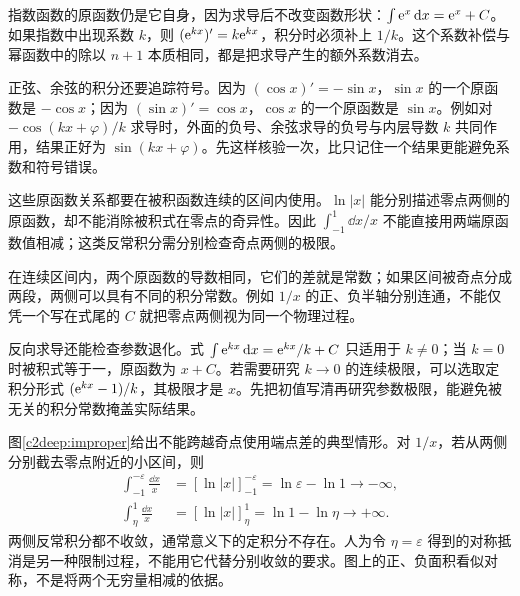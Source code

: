 指数函数的原函数仍是它自身，因为求导后不改变函数形状：$\int\mathrm e^x\mathop{}\!\mathrm d x=\mathrm e^x+C$。如果指数中出现系数 $k$，则 $(\mathrm e^{kx})'=k\mathrm e^{kx}$，积分时必须补上 $1/k$。这个系数补偿与幂函数中的除以 $n+1$ 本质相同，都是把求导产生的额外系数消去。

正弦、余弦的积分还要追踪符号。因为 $(\cos x)'=-\sin x$，$\sin x$ 的一个原函数是 $-\cos x$；因为 $(\sin x)'=\cos x$，$\cos x$ 的一个原函数是 $\sin x$。例如对 $-\cos(kx+\varphi)/k$ 求导时，外面的负号、余弦求导的负号与内层导数 $k$ 共同作用，结果正好为 $\sin(kx+\varphi)$。先这样核验一次，比只记住一个结果更能避免系数和符号错误。

这些原函数关系都要在被积函数连续的区间内使用。$\ln|x|$ 能分别描述零点两侧的原函数，却不能消除被积式在零点的奇异性。因此 $\int_{-1}^{1}\dd x/x$ 不能直接用两端原函数值相减；这类反常积分需分别检查奇点两侧的极限。

在连续区间内，两个原函数的导数相同，它们的差就是常数；如果区间被奇点分成两段，两侧可以具有不同的积分常数。例如 $1/x$ 的正、负半轴分别连通，不能仅凭一个写在式尾的 $C$ 就把零点两侧视为同一个物理过程。

反向求导还能检查参数退化。式 $\int\mathrm e^{kx}\mathop{}\!\mathrm d x=\mathrm e^{kx}/k+C$ 只适用于 $k\ne0$；当 $k=0$ 时被积式等于一，原函数为 $x+C$。若需要研究 $k\to0$ 的连续极限，可以选取定积分形式 $(\mathrm e^{kx}-1)/k$，其极限才是 $x$。先把初值写清再研究参数极限，能避免被无关的积分常数掩盖实际结果。


图\ref{c2deep:improper}给出不能跨越奇点使用端点差的典型情形。对 $1/x$，若从两侧分别截去零点附近的小区间，则
\[
 \begin{aligned}
 \int_{-1}^{-\varepsilon}\frac{\dd x}{x}
 &=[\ln|x|]_{-1}^{-\varepsilon}
 =\ln\varepsilon-\ln1\longrightarrow-\infty,\\
 \int_{\eta}^{1}\frac{\dd x}{x}
 &=[\ln|x|]_{\eta}^{1}
 =\ln1-\ln\eta\longrightarrow+\infty.
 \end{aligned}
\]
两侧反常积分都不收敛，通常意义下的定积分不存在。人为令 $\eta=\varepsilon$ 得到的对称抵消是另一种限制过程，不能用它代替分别收敛的要求。图上的正、负面积看似对称，不是将两个无穷量相减的依据。


